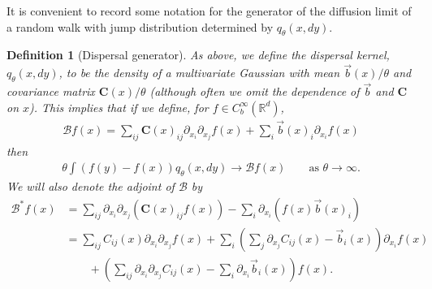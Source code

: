\documentclass[12pt]{article}
\newtheorem{definition}[theorem]{Definition}
\newcommand{\IR}{\mathbb R}
\newcommand{\DG}{\mathcal{B}}  %
\newcommand{\meanq}{\vec b}    %
\newcommand{\covq}{\mathbf{C}}     %
\numberwithin{equation}{section}
\begin{document}
It is convenient to record some notation for the 
generator of the diffusion 
limit of a random walk with jump distribution determined by $q_\theta(x,dy)$.

\begin{definition}[Dispersal generator]
    \label{def:dispersal_generator}
    As above, we define the dispersal kernel,
    $q_\theta(x, dy)$,
    to be the density of a multivariate Gaussian
    with mean $\meanq(x)/\theta$ and covariance matrix $\covq(x)/\theta$
    (although often we omit the dependence of $\meanq$ and $\covq$ on $x$).
    This implies that if we define, for $f \in C_b^\infty(\IR^d)$,
    \begin{align}
    \DG f(x)
        =
        \sum_{ij} \covq(x)_{ij} \partial_{x_i} \partial_{x_j} f(x)
        + \sum_i \meanq(x)_i \partial_{x_i} f(x)
    \end{align}
    then
    \begin{align}
        \theta \int \left(
            f(y) - f(x)
        \right) q_\theta(x, dy)
    \to \DG f(x) 
        \qquad \text{as } \theta \to \infty .
    \end{align}
    We will also denote the adjoint of $\DG$ by
    \begin{align*}
    \DG^* f(x)
        &=
        \sum_{ij} \partial_{x_i} \partial_{x_j} (\covq(x)_{ij} f(x))
        - \sum_i \partial_{x_i} (f(x) \meanq(x)_i) 
        \\
        &=
        \sum_{ij} C_{ij}(x) \partial_{x_i} \partial_{x_j} f(x)
        + \sum_i \left(
            \sum_j \partial_{x_j} C_{ij}(x) - \meanq_i(x)
        \right) \partial_{x_i} f(x)
        \\ & \qquad {}
        + \left(
            \sum_{ij} \partial_{x_i} \partial_{x_j} C_{ij}(x)
            -
            \sum_i \partial_{x_i} \meanq_i(x)
        \right) f(x) .
    \end{align*}
\end{definition}
\end{document}
